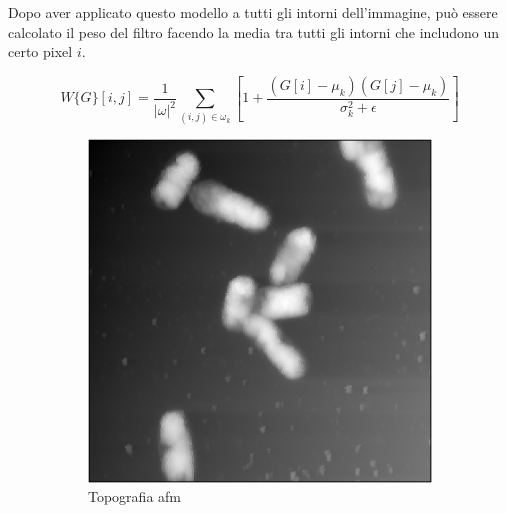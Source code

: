 \documentclass[../main.tex]{subfiles}
\begin{document}
	Dopo aver applicato questo modello a tutti gli intorni dell'immagine, può essere calcolato il peso del filtro facendo la media tra tutti gli intorni che includono un certo pixel $i$.
	
	\begin{equation}
		W\{G\}[i,j] = \frac{1}{|\omega|^2} \sum_{(i,j)\in\omega_k} \left[1+\frac{(G[i]-\mu_k)(G[j]-\mu_k)}{\sigma_k^2+\epsilon}\right]
	\end{equation}
	
	\begin{figure}[ht]
		\centering
		\begin{subfigure}{0.32\linewidth}
			\includegraphics[keepaspectratio, width=\linewidth]{images/entero_z.png}
			\caption{Topografia \acrshort{afm}}
		\end{subfigure}
		\begin{subfigure}{0.32\linewidth}

\end{subfigure}
\end{figure}
\end{document}
